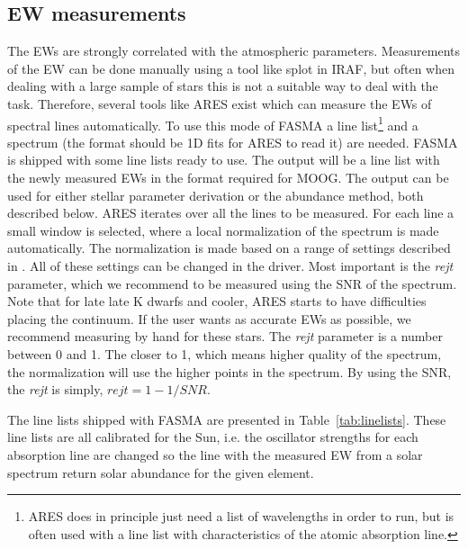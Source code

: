 \documentclass{aa}
\begin{document}
\subsection{EW measurements}
\label{sub:EW_measurements}
The EWs are strongly correlated with the atmospheric parameters. Measurements of
the EW can be done manually using a tool like splot in IRAF, but often when
dealing with a large sample of stars this is not a suitable way to deal with the
task. Therefore, several tools like ARES exist which can measure the EWs of
spectral lines automatically. To use this mode of FASMA a line
list\footnote{ARES does in principle just need a list of wavelengths in order to
run, but is often used with a line list with characteristics of the atomic
absorption line.} and a spectrum (the format should be 1D fits for ARES to read
it) are needed. FASMA is shipped with some line lists ready to use. The output
will be a line list with the newly measured EWs in the format required for MOOG.
The output can be used for either stellar parameter derivation or the abundance
method, both described below. ARES iterates over all the lines to be measured.
For each line a small window is selected, where a local normalization of the
spectrum is made automatically. The normalization is made based on a range of
settings described in \citet{Sousa2007,Sousa2015a}. All of these settings can be
changed in the driver. Most important is the \emph{rejt} parameter, which we
recommend to be measured using the SNR of the spectrum. Note that for late late
K dwarfs and cooler, ARES starts to have difficulties placing the continuum. If
the user wants as accurate EWs as possible, we recommend measuring by hand for
these stars. The \emph{rejt} parameter is a number between 0 and 1. The closer
to 1, which means higher quality of the spectrum, the normalization will use the
higher points in the spectrum. By using the SNR, the \emph{rejt} is simply,
$\mathit{rejt}=1-1/SNR$.

The line lists shipped with FASMA are presented in Table~\ref{tab:linelists}.
These line lists are all calibrated for the Sun, i.e. the oscillator strengths
for each absorption line are changed so the line with the measured EW from a
solar spectrum return solar abundance for the given element.
\end{document}
